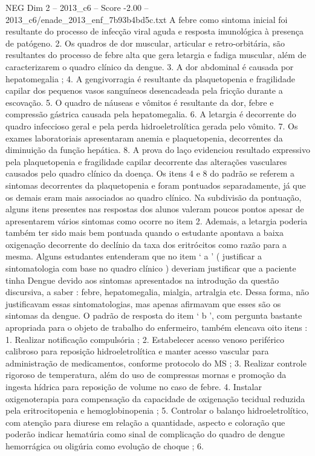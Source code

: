 \begin{textsample}{NEG Dim 2 – 2013\_c6 – Score -2.00 – 2013\_c6/enade\_2013\_enf\_7b93b4bd5c.txt}
A febre como sintoma inicial foi resultante do processo de infecção viral aguda e resposta imunológica à presença de patógeno. 2.
Os quadros de dor muscular, articular e retro-orbitária, são resultantes do processo de febre alta que gera letargia e fadiga muscular, além de caracterizarem o quadro clínico da dengue. 3.
A dor abdominal é causada por hepatomegalia ; 4.
A gengivorragia é resultante da plaquetopenia e fragilidade capilar dos pequenos vasos sanguíneos desencadeada pela fricção durante a escovação. 5.
O quadro de náuseas e vômitos é resultante da dor, febre e compressão gástrica causada pela hepatomegalia. 6.
A letargia é decorrente do quadro infeccioso geral e pela perda hidroeletrolítica gerada pelo vômito. 7.
Os exames laboratoriais apresentaram anemia e plaquetopenia, decorrentes da diminuição da função hepática. 8.
A prova do laço evidenciou resultado expressivo pela plaquetopenia e fragilidade capilar decorrente das alterações vasculares causados pelo quadro clínico da doença.
Os itens 4 e 8 do padrão se referem a sintomas decorrentes da plaquetopenia e foram pontuados separadamente, já que os demais eram mais associados ao quadro clínico.
Na subdivisão da pontuação, alguns itens presentes nas respostas dos alunos valeram poucos pontos apesar de apresentarem vários sintomas como ocorre no item 2.
Ademais, a letargia poderia também ter sido mais bem pontuada quando o estudante apontava a baixa oxigenação decorrente do declínio da taxa dos eritrócitos como razão para a mesma.
Alguns estudantes entenderam que no item ‘ a ’ ( justificar a sintomatologia com base no quadro clínico ) deveriam justificar que a paciente tinha Dengue devido aos sintomas apresentados na introdução da questão discursiva, a saber : febre, hepatomegalia, mialgia, artralgia etc.
Dessa forma, não justificavam essas sintomatologias, mas apenas afirmavam que esses são os sintomas da dengue.
O padrão de resposta do item ‘ b ’, com pergunta bastante apropriada para o objeto de trabalho do enfermeiro, também elencava oito itens : 1.
Realizar notificação compulsória ; 2.
Estabelecer acesso venoso periférico calibroso para reposição hidroeletrolítica e manter acesso vascular para administração de medicamentos, conforme protocolo do MS ; 3.
Realizar controle rigoroso de temperatura, além do uso de compressas mornas e promoção da ingesta hídrica para reposição de volume no caso de febre. 4.
Instalar oxigenoterapia para compensação da capacidade de oxigenação tecidual reduzida pela eritrocitopenia e hemoglobinopenia ; 5.
Controlar o balanço hidroeletrolítico, com atenção para diurese em relação a quantidade, aspecto e coloração que poderão indicar hematúria como sinal de complicação do quadro de dengue hemorrágica ou oligúria como evolução de choque ; 6.

\end{textsample}
